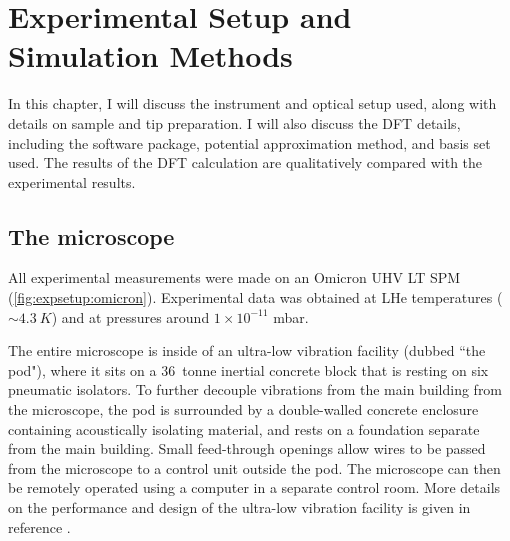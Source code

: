 
\chapter{Experimental Setup and Simulation Methods}
\label{ch:expsetup}

In this chapter, I will discuss the instrument and optical setup used, along with details on sample and tip preparation. I will also discuss the \ac{DFT} details, including the software package, potential approximation method, and basis set used. The results of the \ac{DFT} calculation are qualitatively compared with the experimental results.


\section{The microscope}

All experimental measurements were made on an Omicron \ac{UHV} \ac{LT} \ac{SPM} (\autoref{fig:expsetup:omicron}). Experimental data was obtained at \ac{LHe} temperatures ($\sim \SI{4.3}{K}$) and at pressures around $1 \times 10^{-11}$ mbar. 

\begin{figure} [h]
    \centering
    \caption{}
    \label{fig:expsetup:omicron}
\end{figure}

The entire microscope is inside of an ultra-low vibration facility (dubbed ``the pod"), where it sits on a \SI{36}{tonne} inertial concrete block that is resting on six pneumatic isolators. To further decouple vibrations from the main building from the microscope, the pod is surrounded by a double-walled concrete enclosure containing acoustically isolating material, and rests on a foundation separate from the main building. Small feed-through openings allow wires to be passed from the microscope to a control unit outside the pod. The microscope can then be remotely operated using a computer in a separate control room. More details on the performance and design of the ultra-low vibration facility is given in reference \citep{macleod2015ultra}.

